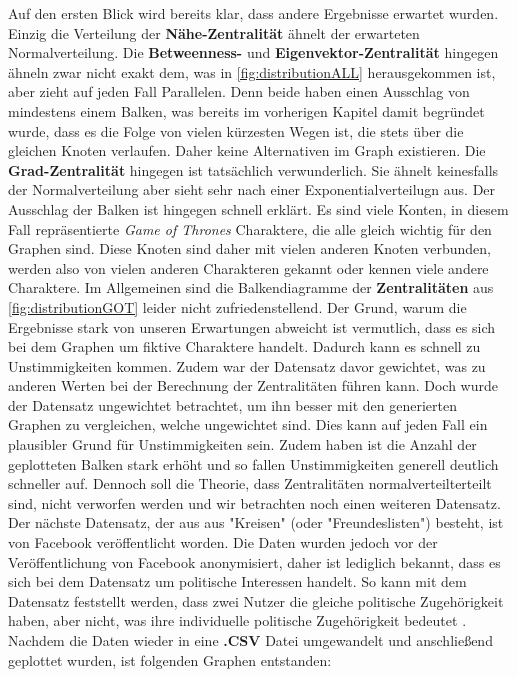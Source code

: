  Auf den ersten Blick wird bereits klar, dass andere Ergebnisse erwartet wurden. Einzig die Verteilung der \textbf{Nähe-Zentralität} ähnelt der erwarteten Normalverteilung. Die \textbf{Betweenness-} und \textbf{Eigenvektor-Zentralität} hingegen ähneln zwar nicht exakt dem, was in \ref{fig:distributionALL} herausgekommen ist, aber zieht auf jeden Fall Parallelen. Denn beide haben einen Ausschlag von mindestens einem Balken, was bereits im vorherigen Kapitel damit begründet wurde, dass es die Folge von vielen kürzesten Wegen ist, die stets über die gleichen
Knoten verlaufen. Daher keine Alternativen im Graph existieren. Die \textbf{Grad-Zentralität} hingegen ist tatsächlich verwunderlich. Sie ähnelt keinesfalls der Normalverteilung aber sieht sehr nach einer Exponentialverteilugn aus. Der Ausschlag der Balken ist hingegen schnell erklärt. Es sind viele Konten, in diesem Fall repräsentierte \textit{Game of Thrones} Charaktere, die alle gleich wichtig für den Graphen sind. Diese Knoten sind daher mit vielen anderen Knoten verbunden, werden also von vielen anderen Charakteren gekannt oder kennen viele andere Charaktere. Im Allgemeinen sind die Balkendiagramme der \textbf{Zentralitäten} aus \ref{fig:distributionGOT} leider nicht zufriedenstellend. Der Grund, warum die Ergebnisse stark von unseren Erwartungen abweicht ist vermutlich, dass es sich bei dem Graphen um fiktive Charaktere handelt. Dadurch kann es schnell zu Unstimmigkeiten kommen. Zudem war der Datensatz davor gewichtet, was zu anderen Werten bei der Berechnung der Zentralitäten führen kann. Doch wurde der Datensatz ungewichtet betrachtet, um ihn besser mit den generierten Graphen zu vergleichen, welche ungewichtet sind. Dies kann auf jeden Fall ein plausibler Grund für Unstimmigkeiten sein. Zudem haben ist die Anzahl der geplotteten Balken stark erhöht und so fallen Unstimmigkeiten generell deutlich schneller auf. Dennoch soll die Theorie, dass Zentralitäten normalverteilterteilt sind, nicht verworfen werden und wir betrachten noch einen weiteren Datensatz. Der nächste Datensatz, der aus aus "Kreisen" (oder "Freundeslisten") besteht, ist von Facebook veröffentlicht worden. Die Daten wurden jedoch vor der Veröffentlichung von Facebook anonymisiert, daher ist lediglich bekannt, dass es sich bei dem Datensatz um politische Interessen handelt. So kann mit dem Datensatz feststellt werden, dass zwei Nutzer die gleiche politische Zugehörigkeit haben, aber nicht, was ihre individuelle politische Zugehörigkeit bedeutet \cite{FBData}.
Nachdem die Daten wieder in eine \textbf{.CSV} Datei umgewandelt und anschließend geplottet wurden, ist folgenden Graphen entstanden: 



